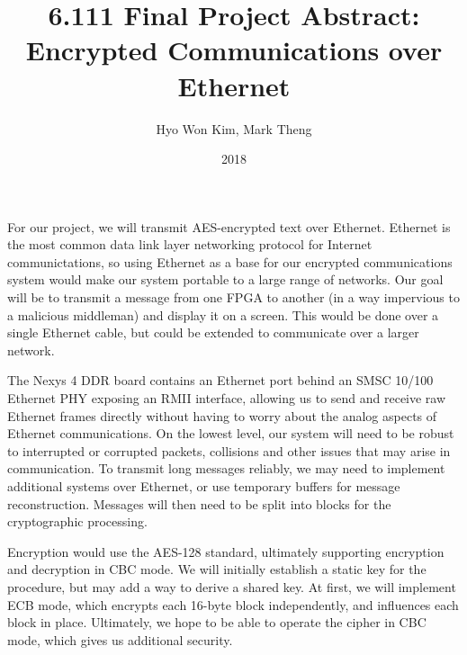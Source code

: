 \documentclass{article}
\title{6.111 Final Project Abstract: Encrypted Communications over Ethernet}
\date{2018}
\author{Hyo Won Kim, Mark Theng}
\begin{document}
\maketitle

For our project, we will transmit AES-encrypted text over Ethernet. Ethernet is the most common data link layer networking protocol for Internet communictations, so using Ethernet as a base for our encrypted communications system would make our system portable to a large range of networks. Our goal will be to transmit a message from one FPGA to another (in a way impervious to a malicious middleman) and display it on a screen. This would be done over a single Ethernet cable, but could be extended to communicate over a larger network.

The Nexys 4 DDR board contains an Ethernet port behind an SMSC 10/100 Ethernet PHY exposing an RMII interface, allowing us to send and receive raw Ethernet frames directly without having to worry about the analog aspects of Ethernet communications. On the lowest level, our system will need to be robust to interrupted or corrupted packets, collisions and other issues that may arise in communication. To transmit long messages reliably, we may need to implement additional systems over Ethernet, or use temporary buffers for message reconstruction. Messages will then need to be split into blocks for the cryptographic processing.

Encryption would use the AES-128 standard, ultimately supporting encryption and decryption in CBC mode. We will initially establish a static key for the procedure, but may add a way to derive a shared key. At first, we will implement ECB mode, which encrypts each 16-byte block independently, and influences each block in place. Ultimately, we hope to be able to operate the cipher in CBC mode, which gives us additional security. 
\end{document}
